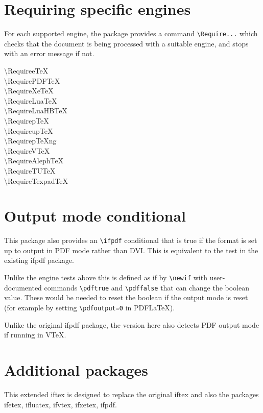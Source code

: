 \documentclass{article}
\newcommand\cs[1]{{\ttfamily\textbackslash #1}}
\begin{document}
\section{Requiring specific engines}
For each supported engine, the package provides a command
\verb|\Require...| which checks that the document is being processed
with a suitable engine, and stops with an error message if not.

\begin{description}
\item[\cs{RequireeTeX}]
\item[\cs{RequirePDFTeX}]
\item[\cs{RequireXeTeX}]
\item[\cs{RequireLuaTeX}]
\item[\cs{RequireLuaHBTeX}]
\item[\cs{RequirepTeX}]
\item[\cs{RequireupTeX}]
\item[\cs{RequirepTeXng}]
\item[\cs{RequireVTeX}]
\item[\cs{RequireAlephTeX}]
\item[\cs{RequireTUTeX}]
\item[\cs{RequireTexpadTeX}]
\end{description}


\section{Output mode conditional}
This package also provides an \verb|\ifpdf| conditional that is true
if the format is set up to output in PDF mode rather than DVI. This is
equivalent to the test in the existing \textsf{ifpdf} package.

Unlike the engine tests above this is defined as if by \verb|\newif|
with user-documented commands \verb|\pdftrue| and \verb|\pdffalse| that can
change the boolean value. These would be needed to reset the boolean
if the output mode is reset (for example by setting
\verb|\pdfoutput=0| in PDF\LaTeX).

Unlike the original \textsf{ifpdf} package, the version here also
detects PDF output mode if running in V\TeX.

\section{Additional packages}
This extended \textsf{iftex} is designed to replace the original
\textsf{iftex} and also the packages
\textsf{ifetex},
\textsf{ifluatex},
\textsf{ifvtex},
\textsf{ifxetex},
\textsf{ifpdf}.
\end{document}
